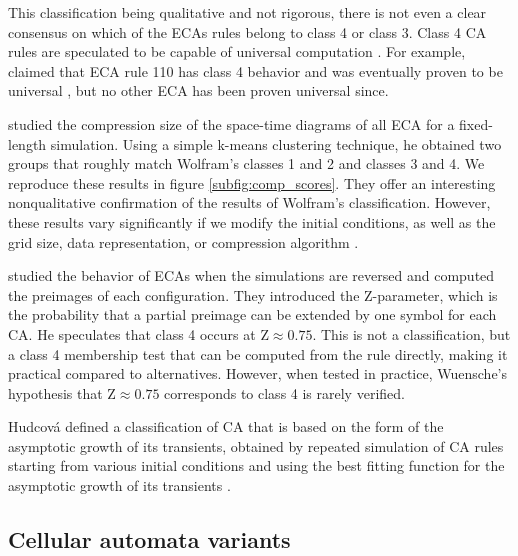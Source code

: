 This classification being qualitative and not rigorous, there is not even a
clear consensus on which of the \acp{ECA} rules belong to class 4 or class 3.
Class 4 \ac{CA} rules are speculated to be capable of universal computation
\parencite{wolframUniversalityComplexityCellular1984}. For example,
\textcite{liStructureElementaryCellular1990} claimed that \ac{ECA} rule 110 has
class 4 behavior and was eventually proven to be universal
\parencite{cookUniversalityElementaryCellular2004}, but no other \ac{ECA} has
been proven universal since.

\textcite{zenilCompressionBasedInvestigationDynamical2010} studied the
compression size of the space-time diagrams of all \ac{ECA} for a fixed-length
simulation. Using a simple k-means clustering technique, he obtained two groups
that roughly match Wolfram’s classes 1 and 2 and classes 3 and 4. We reproduce
these results in figure \ref{subfig:comp_scores}. They offer an interesting
nonqualitative confirmation of the results of Wolfram's classification.
However, these results vary significantly if we modify the initial conditions, as
well as the grid size, data representation, or compression algorithm
\parencite{hudcovaClassificationComplexSystems2020}.

\textcite{wuenscheGlobalDynamicsCellular1992} studied the behavior of \acp{ECA}
when the simulations are reversed and computed the preimages of each
configuration. They introduced the Z-parameter, which is the probability that a
partial preimage can be extended by one symbol for each \ac{CA}. He speculates
that class 4 occurs at $\text{Z} \approx 0.75$. This is not a classification, but a
class 4 membership test that can be computed from the rule directly, making it
practical compared to alternatives. However, when tested in practice, Wuensche's
hypothesis that $\text{Z} \approx 0.75$ corresponds to class 4 is rarely verified.

Hudcová defined a classification of \ac{CA} that is based on the form of the
asymptotic growth of its transients, obtained by repeated simulation of
\ac{CA} rules starting from various initial conditions and using the best
fitting function for the asymptotic growth of its transients
\parencite{hudcovaClassificationComplexSystems2020,
  hudcovaClassificationDiscreteDynamical2022}.

\subsection{Cellular automata variants}

